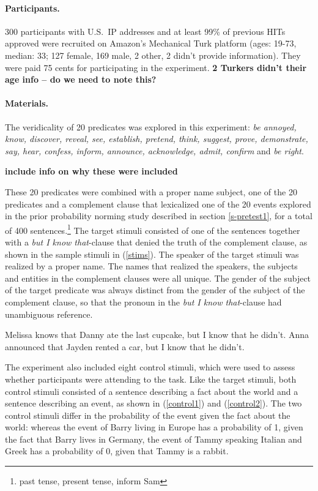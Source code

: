 \documentclass[11pt,fleqn]{article}
\newcommand{\6}{\mbox{$[\hspace*{-.6mm}[$}}
\newcommand{\9}{\mbox{$]\hspace*{-.6mm}]$}}
\begin{document}
\paragraph{Participants.} 300 participants with U.S.\ IP addresses and at least 99\% of previous HITs approved were recruited on Amazon's Mechanical Turk platform (ages: 19-73, median: 33; 127 female, 169 male, 2 other, 2 didn't provide information). They were paid 75 cents for participating in the experiment. {\bf 2 Turkers didn't their age info -- do we need to note this?}

\paragraph{Materials.} The veridicality of 20 predicates was explored in this experiment: {\em be annoyed, know, discover, reveal, see, establish, pretend, think, suggest, prove, demonstrate, say, hear, confess, inform, announce, acknowledge, admit, confirm} and {\em be right}. 

{\bf include info on why these were included}

These 20 predicates were combined with a proper name subject, one of the 20 predicates and a complement clause that lexicalized one of the 20 events explored in the prior probability norming study described in section \ref{s-pretest1}, for a total of 400 sentences.\footnote{past tense, present tense, inform Sam} The target stimuli consisted of one of the sentences together with a {\em but I know that}-clause that denied the truth of the complement clause, as shown in the sample stimuli in (\ref{stims}). The speaker of the target stimuli was realized by a proper name. The names that realized the speakers, the subjects and entities in the complement clauses were all unique. The gender of the subject of the target predicate was always distinct from the gender of the subject of the complement clause, so that the pronoun in the {\em but I know that}-clause had unambiguous reference.

\begin{exe}
\ex\label{stims}
\begin{xlist}
 Melissa knows that Danny ate the last cupcake, but I know that he didn't.
 Anna announced that Jayden rented a car, but I know that he didn't.
\end{xlist}
\end{exe}

The experiment also included eight control stimuli, which were used to assess whether participants were attending to the task. Like the target stimuli, both control stimuli consisted of a sentence describing a fact about the world and a sentence describing an event, as shown in (\ref{control1}) and (\ref{control2}). The two control stimuli differ in the probability of the event given the fact about the world: whereas the event of Barry living in Europe has a probability of 1, given the fact that Barry lives in Germany, the event of Tammy speaking Italian and Greek has a probability of 0, given that Tammy is a rabbit. 
\end{document}
